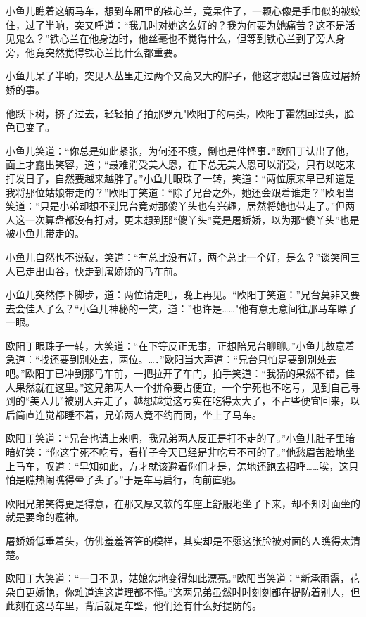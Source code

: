 \documentclass[12pt,oneside]{book}
\begin{document}
小鱼儿瞧着这辆马车，想到车厢里的铁心兰，竟呆住了，一颗心像是手巾似的被绞住，过了半晌，突又呼道：``我几时对她这么好的？我为何要为她痛苦？这不是活见鬼么？''铁心兰在他身边时，他丝毫也不觉得什么，但等到铁心兰到了旁人身旁，他竟突然觉得铁心兰比什么都重要。

小鱼儿呆了半晌，突见人丛里走过两个又高又大的胖子，他这才想起已答应过屠娇娇的事。

他跃下树，挤了过去，轻轻拍了拍那罗九"欧阳丁的肩头，欧阳丁霍然回过头，脸色已变了。

小鱼儿笑道：``你总是如此紧张，为何还不瘦，倒也是件怪事．''欧阳丁认出了他，面上才露出笑容，道；``最难消受美人恩，在下总无美人恩可以消受，只有以吃来打发日子，自然要越来越胖了。''小鱼儿眼珠子一转，笑道：``两位原来早已知道是我将那位姑娘带走的？''欧阳丁笑道：``除了兄台之外，她还会跟着谁走？''欧阳当笑道：``只是小弟却想不到兄台竟对那傻丫头也有兴趣，居然将她也带走了。''但两人这一次算盘都没有打对，更未想到那``傻丫头''竟是屠娇娇，以为那``傻丫头''也是被小鱼儿带走的。

小鱼儿自然也不说破，笑道：``有总比没有好，两个总比一个好，是么？''谈笑间三人已走出山谷，快走到屠娇娇的马车前。

小鱼儿突然停下脚步，道：两位请走吧，晚上再见。``欧阳丁笑道：''兄台莫非又要去会佳人了么？``小鱼儿神秘的一笑，道：''也许是\ldots\ldots"他有意无意间往那马车瞟了一眼。

欧阳丁眼珠子一转，大笑道：``在下等反正无事，正想陪兄台聊聊。''小鱼儿故意着急道：``找还要到别处去，两位。\ldots．''欧阳当大声道：``兄台只怕是要到别处去吧。''欧阳丁已冲到那马车前，一把拉开了车门，拍手笑道：``我猜的果然不错，佳人果然就在这里。''这兄弟两人一个拼命要占便宜，一个宁死也不吃亏，见到自己寻到的``美人儿''被别人弄走了，越想越觉这亏实在吃得太大了，不占些便宜回来，以后简直连觉都睡不着，兄弟两人竟不约而同，坐上了马车。

欧阳丁笑道：``兄台也请上来吧，我兄弟两人反正是打不走的了。''小鱼儿肚子里暗暗好笑：``你这宁死不吃亏，看样子今天已经是非吃亏不可的了。''他愁眉苦脸地坐上马车，叹道：``早知如此，方才就该避着你们才是，怎地还跑去招呼\ldots\ldots 唉，这只怕是瞧热闹瞧得晕了头了。''于是车马启行，向前直驰。

欧阳兄弟笑得更是得意，在那又厚又软的车座上舒服地坐了下来，却不知对面坐的就是要命的瘟神。

屠娇娇低垂着头，仿佛羞羞答答的模样，其实却是不愿这张脸被对面的人瞧得太清楚。

欧阳丁大笑道：``一日不见，姑娘怎地变得如此漂亮。''欧阳当笑道：``新承雨露，花朵自更娇艳，你难道连这道理都不懂。''这两兄弟虽然时时刻刻都在提防着别人，但此刻在这马车里，背后就是车壁，他们还有什么好提防的。
\end{document}
